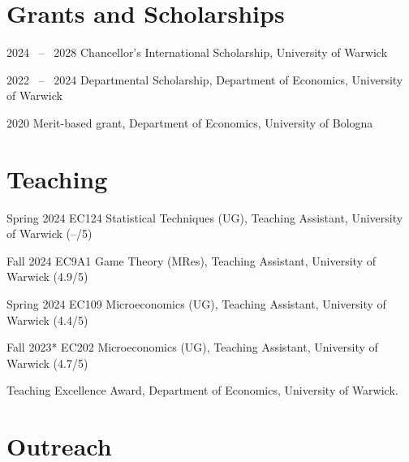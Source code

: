\documentclass[11pt,a4paper]{article}
\begin{document}


\section{Grants and Scholarships}

\begin{cvenumerate}
    \item[2024 \ -- \ 2028] Chancellor's International Scholarship, University of Warwick
    \item[2022 \ -- \ 2024] Departmental Scholarship, Department of Economics, University of Warwick
    \item[2020] Merit-based grant, Department of Economics, University of Bologna
\end{cvenumerate}

\section{Teaching}

\begin{cvenumerate}
    \item[Spring 2024] EC124 Statistical Techniques (UG), Teaching Assistant, University of Warwick (--/5)
    \item[Fall 2024] EC9A1 Game Theory (MRes), Teaching Assistant, University of Warwick (4.9/5)
    \item[Spring 2024] EC109 Microeconomics (UG), Teaching Assistant, University of Warwick (4.4/5)
    \item[Fall 2023*] EC202 Microeconomics (UG), Teaching Assistant, University of Warwick (4.7/5)
\end{cvenumerate}
\vspace{-10pt}
{\small*Teaching Excellence Award, Department of Economics, University of Warwick.}

\section{Outreach}
\end{document}
